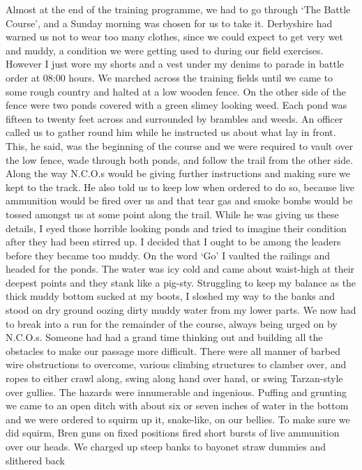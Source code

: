 Almost at the end of the training programme, we had to go through `The
Battle Course', and a Sunday morning was chosen for us to take it.
\Lcorporal Derbyshire had warned us not to wear too many clothes, since
we could expect to get very wet and muddy, a condition we were getting
used to during our field exercises. However I just wore my shorts and
a vest under my denims to parade in battle order at 08:00 hours. We
marched across the training fields until we came to some rough country
and halted at a low wooden fence. On the other side of the fence were
two ponds covered with a green slimey looking weed. Each pond was
fifteen to twenty feet across and surrounded by brambles and weeds.
An officer called us to gather round him while he instructed us about
what lay in front. This, he said, was the beginning of the course and
we were required to vault over the low fence, wade through both ponds,
and follow the trail from the other side. Along the way N.C.O.s would
be giving further instructions and making sure we kept to the
track. He also told us to keep low when ordered to do so, because live
ammunition would be fired over us and that tear gas and smoke bombs
would be tossed amongst us at some point along the trail. While he was
giving us these details, I eyed those horrible looking ponds and tried
to imagine their condition after they had been stirred up. I decided
that I ought to be among the leaders before they became too muddy. On
the word `Go' I vaulted the railings and headed for the ponds. The
water was icy cold and came about waist-high at their deepest points
and they stank like a pig-sty.  Struggling to keep my balance as the
thick muddy bottom sucked at my boots, I sloshed my way to the banks
and stood on dry ground oozing dirty muddy water from my lower
parts. We now had to break into a run for the remainder of the course,
always being urged on by N.C.O.s.  Someone had had a grand time
thinking out and building all the obstacles to make our passage more
difficult. There were all manner of barbed wire obstructions to
overcome, various climbing structures to clamber over, and ropes to
either crawl along, swing along hand over hand, or swing Tarzan-style
over gullies. The hazards were innumerable and ingenious. Puffing and
grunting we came to an open ditch with about six or seven inches of
water in the bottom and we were ordered to squirm up it, snake-like,
on our bellies. To make sure we did squirm, Bren guns on fixed
positions fired short bursts of live ammunition over our heads. We
charged up steep banks to bayonet straw dummies and slithered back
